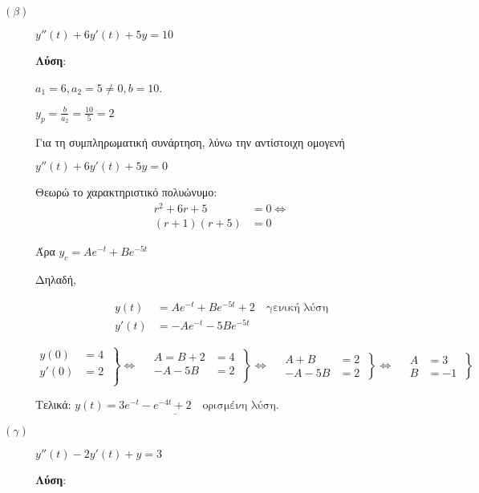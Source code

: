 \documentclass[a4paper,12pt]{article}
\begin{document}
\begin{description}
\item [$(\beta)$] $\boxed{y''(t)+6y'(t) +5y=10}$

\textbf{Λύση}:

\vspace{\baselineskip}

$a_1=6, a_2=5\neq 0, b=10$.

$y_p=\frac{b}{a_2}=\frac{10}{5}=2$

Για τη συμπληρωματική συνάρτηση, λύνω την αντίστοιχη ομογενή

$y''(t)+6y'(t) +5y = 0$

Θεωρώ το χαρακτηριστικό πολυώνυμο:
\begin{align*}
r^2+6r+5&=0 \Leftrightarrow \\
(r+1)(r+5)&=0
\end{align*}

Άρα $y_c=Ae^{-t} + Be^{-5t} $

Δηλαδή,

\begin{align*}
y(t) &= Ae^{-t} + Be^{-5t} +2 \quad \text{γενική λύση} \\
y'(t) &= -Ae^{-t}-5Be^{-5t}
\end{align*}

\[
  \left.\begin{aligned}
y(0)&=4 \\
y'(0)&=2\\
  \end{aligned}\:\right\}\Leftrightarrow \quad
 \left.\begin{aligned}
A=B+2&=4 \\
-A-5B&=2\\
  \end{aligned}\:\right\}\Leftrightarrow \quad
 \left.\begin{aligned}
A+B&=2\\
-A-5B&=2
  \end{aligned}\:\right\}\Leftrightarrow \quad
 \left.\begin{aligned}
A&=3 \\
B&=-1
  \end{aligned}\:\right\}
\]


Τελικά: $\underline{y(t) = 3e^{-t}-e^{-4t} +2 \quad \text{ορισμένη λύση}}$.


\vspace{\baselineskip}

\item [$(\gamma)$] $\boxed{y''(t)-2y'(t) +y=3}$

\textbf{Λύση}:


\end{description}
\end{document}
